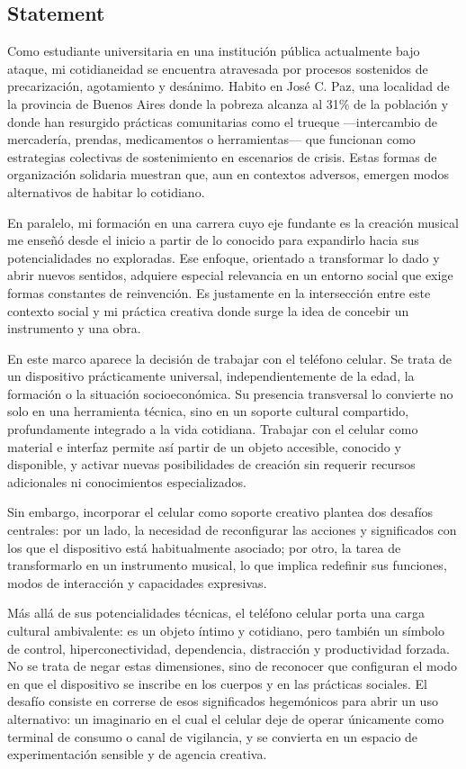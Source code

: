 \documentclass[spanish]{report}
\begin{document}
\subsection{Statement}
Como estudiante universitaria en una institución pública actualmente bajo ataque, mi cotidianeidad se encuentra atravesada por procesos sostenidos de precarización, agotamiento y desánimo. Habito en José C. Paz, una localidad de la provincia de Buenos Aires donde la pobreza alcanza al 31\% de la población y donde han resurgido prácticas comunitarias como el trueque —intercambio de mercadería, prendas, medicamentos o herramientas— que funcionan como estrategias colectivas de sostenimiento en escenarios de crisis. Estas formas de organización solidaria muestran que, aun en contextos adversos, emergen modos alternativos de habitar lo cotidiano.

En paralelo, mi formación en una carrera cuyo eje fundante es la creación musical me enseñó desde el inicio a partir de lo conocido para expandirlo hacia sus potencialidades no exploradas. Ese enfoque, orientado a transformar lo dado y abrir nuevos sentidos, adquiere especial relevancia en un entorno social que exige formas constantes de reinvención. Es justamente en la intersección entre este contexto social y mi práctica creativa donde surge la idea de concebir un instrumento y una obra.

En este marco aparece la decisión de trabajar con el teléfono celular. Se trata de un dispositivo prácticamente universal, independientemente de la edad, la formación o la situación socioeconómica. Su presencia transversal lo convierte no solo en una herramienta técnica, sino en un soporte cultural compartido, profundamente integrado a la vida cotidiana. Trabajar con el celular como material e interfaz permite así partir de un objeto accesible, conocido y disponible, y activar nuevas posibilidades de creación sin requerir recursos adicionales ni conocimientos especializados.

Sin embargo, incorporar el celular como soporte creativo plantea dos desafíos centrales: por un lado, la necesidad de reconfigurar las acciones y significados con los que el dispositivo está habitualmente asociado; por otro, la tarea de transformarlo en un instrumento musical, lo que implica redefinir sus funciones, modos de interacción y capacidades expresivas.

Más allá de sus potencialidades técnicas, el teléfono celular porta una carga cultural ambivalente: es un objeto íntimo y cotidiano, pero también un símbolo de control, hiperconectividad, dependencia, distracción y productividad forzada. No se trata de negar estas dimensiones, sino de reconocer que configuran el modo en que el dispositivo se inscribe en los cuerpos y en las prácticas sociales. El desafío consiste en correrse de esos significados hegemónicos para abrir un uso alternativo: un imaginario en el cual el celular deje de operar únicamente como terminal de consumo o canal de vigilancia, y se convierta en un espacio de experimentación sensible y de agencia creativa.
\end{document}
